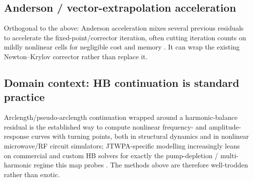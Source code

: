\documentclass[11pt]{article}
\begin{document}
\subsection{Anderson / vector-extrapolation acceleration}
Orthogonal to the above: Anderson acceleration mixes several previous residuals
to accelerate the fixed-point/corrector iteration, often cutting iteration counts
on mildly nonlinear cells for negligible cost and memory
\cite{WalkerNi2011}. It can wrap the existing Newton--Krylov corrector rather
than replace it.

\subsection{Domain context: HB continuation is standard practice}
Arclength/pseudo-arclength continuation wrapped around a harmonic-balance
residual is the established way to compute nonlinear frequency- and
amplitude-response curves with turning points, both in structural dynamics
\cite{ArclengthHB_Rotor} and in nonlinear microwave/RF circuit simulators;
JTWPA-specific modelling increasingly leans on commercial and custom HB solvers
for exactly the pump-depletion / multi-harmonic regime this map probes
\cite{JTWPA_CircuitSim2022,JTWPA_EMcosim2024}. The methods above are therefore
well-trodden rather than exotic.

\end{document}
